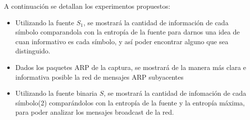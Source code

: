 A continuación se detallan los experimentos propuestos:

\begin{itemize}

	\item Utilizando la fuente $S_1$, se mostrará la cantidad de información de cada símbolo comparandola con la entropía de la fuente para darnos una idea de cuan informativo es cada símbolo, y así poder encontrar alguno que sea distinguido.
	\item Dados los paquetes ARP de la captura, se mostrará de la manera más clara e informativa posible la red de mensajes ARP subyacentes
	\item Utilizando la fuente binaria $S$, se mostrará la cantidad de infomación de cada símbolo(2) comparándolos con la entropía de la fuente y la entropía máxima, para poder analizar los mensajes broadcast de la red. 

\end{itemize}